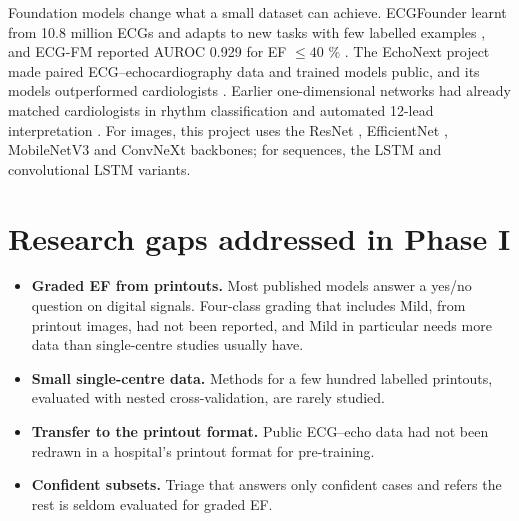 Foundation models change what a small dataset can achieve. ECGFounder learnt from 10.8 million ECGs and adapts to new tasks with few labelled examples \cite{ref21}, and ECG-FM reported AUROC 0.929 for EF $\le40$ \% \cite{ref22}. The EchoNext project made paired ECG--echocardiography data and trained models public, and its models outperformed cardiologists \cite{ref23,ref24}. Earlier one-dimensional networks had already matched cardiologists in rhythm classification \cite{ref25} and automated 12-lead interpretation \cite{ref26}. For images, this project uses the ResNet \cite{ref27}, EfficientNet \cite{ref28}, MobileNetV3 \cite{ref29} and ConvNeXt \cite{ref30} backbones; for sequences, the LSTM \cite{ref31} and convolutional LSTM variants.

\section{Research gaps addressed in Phase I}\label{sec:2.4}

\begin{itemize}
  \item \textbf{Graded EF from printouts.} Most published models answer a yes/no question on digital signals. Four-class grading that includes Mild, from printout images, had not been reported, and Mild in particular needs more data than single-centre studies usually have.
  \item \textbf{Small single-centre data.} Methods for a few hundred labelled printouts, evaluated with nested cross-validation, are rarely studied.
  \item \textbf{Transfer to the printout format.} Public ECG--echo data had not been redrawn in a hospital's printout format for pre-training.
  \item \textbf{Confident subsets.} Triage that answers only confident cases and refers the rest is seldom evaluated for graded EF.
\end{itemize}
